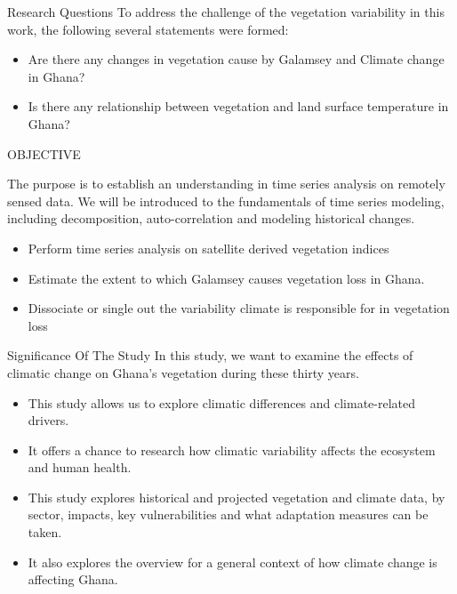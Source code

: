 \documentclass[11pt]{beamer}
\begin{document}
\begin{frame}
	\begin{block}{Research Questions}
To address the challenge of the vegetation variability in this work, the following several statements were formed:

\begin{itemize}
	\item  Are there any changes in vegetation cause by Galamsey and Climate change in Ghana?
	
	\item Is there any relationship between vegetation and land surface temperature in Ghana?
\end{itemize}
	\end{block}
\end{frame}
\begin{frame}
	\begin{block}{OBJECTIVE}
	
	The purpose is to establish an understanding in time series analysis on remotely sensed data. We will be introduced to the fundamentals of time series modeling, including decomposition, auto-correlation and modeling historical changes.
	
	\begin{itemize}
		\item Perform time series analysis on satellite derived vegetation indices
		
		\item Estimate the extent to which Galamsey causes vegetation loss in Ghana.
		
		\item Dissociate or single out the variability climate is responsible for in vegetation loss
	\end{itemize}
	\end{block}
\end{frame}
\begin{frame}
	\begin{block}{Significance Of The Study}
		In this study, we want to examine the effects of climatic change on Ghana's vegetation during these thirty years.
		
		\begin{itemize}
		\item 	This study allows us to explore climatic differences and climate-related drivers.
		\item	It offers a chance to research how climatic variability affects the ecosystem and human health. 
		\item	This study explores historical and projected vegetation and climate data, by sector, impacts, key vulnerabilities and what adaptation measures can be taken.
		\item	It also explores the overview for a general context of how climate change is affecting Ghana.
		\end{itemize}
	\end{block}
\end{frame}
\end{document}

